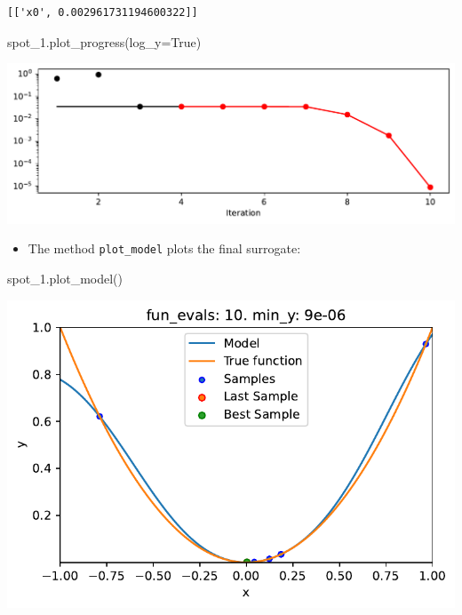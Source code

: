 \documentclass[
  letterpaper,
  DIV=11,
  numbers=noendperiod]{scrreprt}
\newenvironment{Shaded}{\begin{snugshade}}{\end{snugshade}}
\newcommand{\NormalTok}[1]{\textcolor[rgb]{0.00,0.23,0.31}{#1}}
\newcommand{\OperatorTok}[1]{\textcolor[rgb]{0.37,0.37,0.37}{#1}}
\newcommand{\VariableTok}[1]{\textcolor[rgb]{0.07,0.07,0.07}{#1}}
\providecommand{\tightlist}{%
  \setlength{\itemsep}{0pt}\setlength{\parskip}{0pt}}\usepackage{longtable,booktabs,array}
\begin{document}
\begin{verbatim}
[['x0', 0.002961731194600322]]
\end{verbatim}

\begin{Shaded}
\begin{Highlighting}[]
\NormalTok{spot\_1.plot\_progress(log\_y}\OperatorTok{=}\VariableTok{True}\NormalTok{)}
\end{Highlighting}
\end{Shaded}

\includegraphics{010_num_spot_sklearn_surrogate_files/figure-pdf/cell-22-output-1.pdf}

\begin{itemize}
\tightlist
\item
  The method \texttt{plot\_model} plots the final surrogate:
\end{itemize}

\begin{Shaded}
\begin{Highlighting}[]
\NormalTok{spot\_1.plot\_model()}
\end{Highlighting}
\end{Shaded}

\includegraphics{010_num_spot_sklearn_surrogate_files/figure-pdf/cell-23-output-1.pdf}
\end{document}
